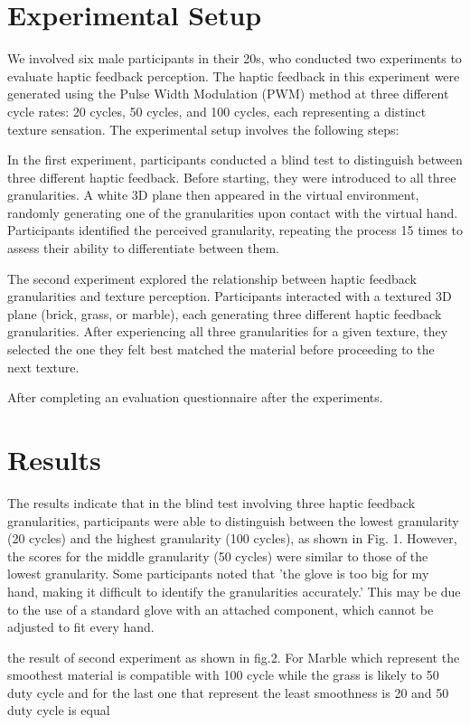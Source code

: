 \documentclass[a4paper,twocolumn]{article}
\begin{document}
\section{Experimental Setup}
We involved six male participants in their 20s, who conducted two experiments to evaluate haptic feedback perception. The haptic feedback in this experiment were generated using the Pulse Width Modulation (PWM) method at three different cycle rates: 20 cycles, 50 cycles, and 100 cycles, each representing a distinct texture sensation. The experimental setup involves the following steps: \par
In the first experiment, participants conducted a blind test to distinguish between three different haptic feedback. Before starting, they were introduced to all three granularities. A white 3D plane then appeared in the virtual environment, randomly generating one of the granularities upon contact with the virtual hand. Participants identified the perceived granularity, repeating the process 15 times to assess their ability to differentiate between them.\par
The second experiment explored the relationship between haptic feedback granularities and texture perception. Participants interacted with a textured 3D plane (brick, grass, or marble), each generating three different haptic feedback granularities. After experiencing all three granularities for a given texture, they selected the one they felt best matched the material before proceeding to the next texture.\par
After completing an evaluation questionnaire after the experiments. 					

\section{Results}
The results indicate that in the blind test involving three haptic feedback granularities, participants were able to distinguish between the lowest granularity (20 cycles) and the highest granularity (100 cycles), as shown in Fig. 1. However, the scores for the middle granularity (50 cycles) were similar to those of the lowest granularity. Some participants noted that 'the glove is too big for my hand, making it difficult to identify the granularities accurately.' This may be due to the use of a standard glove with an attached component, which cannot be adjusted to fit every hand.\par
the result of second experiment as shown in fig.2. For Marble which represent the smoothest material is compatible with 100 cycle while the grass is likely to 50 duty cycle and for the last one that represent the least smoothness is 20 and 50 duty cycle is equal
\end{document}

